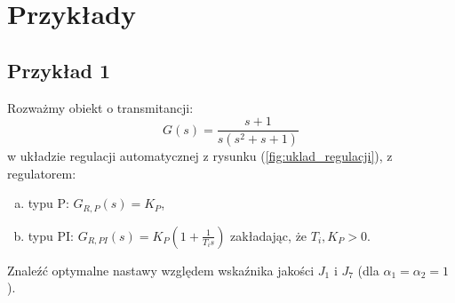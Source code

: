 \documentclass{article}
\begin{document}
    

\section{Przykłady}
    \subsection{Przykład 1}
    Rozważmy obiekt o transmitancji:
    $$
        G(s) = \frac{s+1}{s(s^2 + s + 1)}
    $$
    w układzie regulacji automatycznej z rysunku (\ref{fig:uklad_regulacji}), z regulatorem:
    \begin{enumerate}[(a)]
        \item typu P: $G_{R,P}(s) = K_{P}$,
        \item typu PI: $G_{R,PI}(s) = K_{P}(1 + \frac{1}{T_{i}s})$ zakładając, że $T_{i}, K_{P} > 0$.
    \end{enumerate}
    Znaleźć optymalne nastawy względem wskaźnika jakości $J_{1}$ i $J_{7}$ (dla $\alpha_{1} = \alpha_{2} = 1$).
\end{document}
